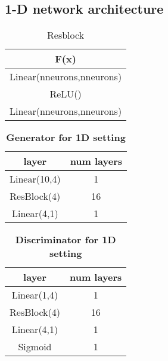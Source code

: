 \subsection{1-D network architecture}

\begin{table}[ht]
\caption{Resblock} %
\centering %
\begin{tabular}{c} %
\hline\hline %
F(x)\\%
\hline %
Linear(nneurons,nneurons)\\ %
ReLU() \\
Linear(nneurons,nneurons) \\
\hline %
\end{tabular}
\label{table:resblock} %
\end{table}


\begin{table}[ht]
\caption{\textbf{Generator for 1D setting}} %
\centering %
\begin{tabular}{c c} %
\hline\hline %
layer & num layers\\%
\hline %
Linear(10,4) & 1\\ %
ResBlock(4) & 16 \\
Linear(4,1) & 1 \\
\hline %
\end{tabular}
\label{table:1d_G} %
\end{table}

\begin{table}[ht]
\caption{\textbf{Discriminator for 1D setting}} %
\centering %
\begin{tabular}{c c} %
\hline\hline %
layer & num layers\\%
\hline %
Linear(1,4) & 1\\ %
ResBlock(4) & 16 \\
Linear(4,1) & 1 \\
Sigmoid & 1 \\
\hline %
\end{tabular}
\label{table:1d_D} %
\end{table}



